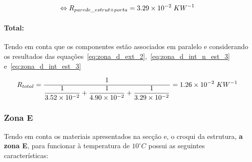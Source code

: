 \documentclass[12pt, a4paper]{article}
\begin{document}
\begin{equation}
    \Leftrightarrow R_{parede\_estrut + porta} = 3.29 \times 10^{-2} \hspace{1mm} KW^{-1}
    \label{eq:zona_d_int_est_3}
\end{equation}


\paragraph{Total:}\label{par:zona_d_total:} Tendo em conta que os componentes est\~ao
associados em paralelo e considerando os resultados das
equa\c{c}\~oes~\ref{eq:zona_d_ext_2},~\ref{eq:zona_d_int_n_est_3} e~\ref{eq:zona_d_int_est_3}

\begin{equation}
    R_{total} = \dfrac{1}{
        \dfrac{1}{
            3.52 \times 10^{-2}
        }
        +
        \dfrac{1}{
            4.90 \times 10^{-2}
        }
        +
        \dfrac{1}{
            3.29 \times 10^{-2}
        }
    }
    = 1.26 \times 10^{-2} \hspace{1mm} KW^{-1}
    \label{eq:zona_d_total}
\end{equation}




\subsubsection{Zona E}\label{ssub:Zona E}

Tendo em conta os materiais apresentados na secção e, o croqui da estrutura, \textbf{a zona E}, para funcionar
à temperatura de $ 10^\circ C $ possui as seguintes características:
\end{document}
